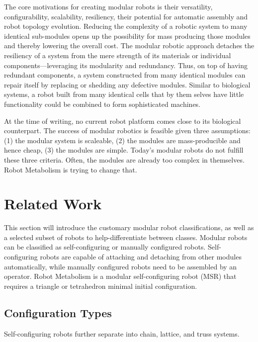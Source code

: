 \documentclass[letterpaper, 10 pt, conference]{ieeeconf}  %
\begin{document}
The core motivations for creating modular robots is their versatility, configurability, scalability, resiliency, their potential for automatic assembly and robot topology evolution\cite{Zykov2007, Yim2009MSRR, Gilpin2010}. Reducing the complexity of a robotic system to many identical sub-modules opens up the possibility for mass producing those modules and thereby lowering the overall cost\cite{Yim2009MSRR}. The modular robotic approach detaches the resiliency of a system from the mere strength of its materials or individual components---leveraging its modularity and redundancy. Thus, on top of having redundant components, a system constructed from many identical modules can repair itself by replacing or shedding any defective modules. Similar to biological systems, a robot built from many identical cells that by them selves have little functionality could be combined to form sophisticated machines.

At the time of writing, no current robot platform comes close to its biological counterpart. The success of modular robotics is feasible given three assumptions: (1) the modular system is scaleable, (2) the modules are mass-producible and hence cheap, (3) the modules are simple. Today's modular robots do not fulfill these three criteria. Often, the modules are already too complex in themselves. Robot Metabolism is trying to change that. 


\section{Related Work}

This section will introduce the customary modular robot classifications, as well as a selected subset of robots to help-differentiate between classes. Modular robots can be classified as self-configuring or manually configured robots\cite{Stoy2010}. Self-configuring robots are capable of attaching and detaching from other modules automatically, while manually configured robots need to be assembled by an operator. Robot Metabolism is a modular self-configuring robot (MSR) that requires a triangle or tetrahedron minimal initial configuration.

\subsection{Configuration Types}
Self-configuring robots further separate into chain, lattice, and truss systems\cite{Yim2007,Gilpin2010}.
\end{document}
